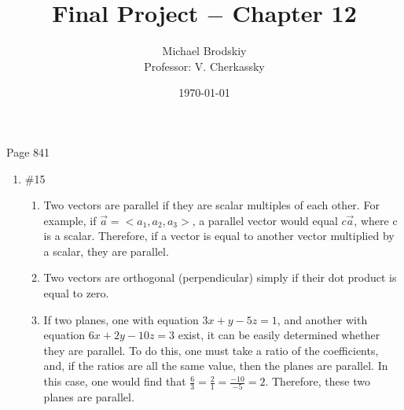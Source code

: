 \documentclass[12pt]{article}
\title{Final Project $-$ Chapter 12}
\date{\today}
\author{Michael Brodskiy\\ \small Professor: V. Cherkassky}
\begin{document}
\maketitle

\begin{center}

Page 841

\end{center}

\begin{enumerate}

  \item \#15 \begin{enumerate}

      \item Two vectors are parallel if they are scalar multiples of each other. For example, if $\vec{a}=<a_1,a_2,a_3>$, a parallel vector would equal $c\vec{a}$, where c is a scalar. Therefore, if a vector is equal to another vector multiplied by a scalar, they are parallel.

     \item Two vectors are orthogonal (perpendicular) simply if their dot product is equal to zero.

     \item If two planes, one with equation $3x+y-5z=1$, and another with equation $6x+2y-10z=3$ exist, it can be easily determined whether they are parallel. To do this, one must take a ratio of the coefficients, and, if the ratios are all the same value, then the planes are parallel. In this case, one would find that $\frac{6}{3}=\frac{2}{1}=\frac{-10}{-5}=2$. Therefore, these two planes are parallel. 

    \end{enumerate}

\end{enumerate}
\end{document}
